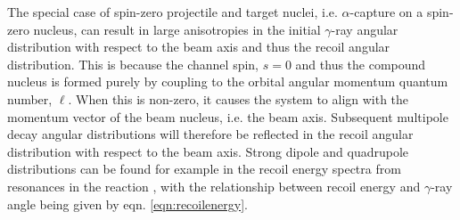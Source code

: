 The special case of spin-zero projectile and target nuclei, i.e. $\alpha$-capture on a spin-zero nucleus, can result in large anisotropies in the initial $\gamma$-ray angular distribution with respect to the beam axis and thus the recoil angular distribution. This is because the channel spin, $s=0$ and thus the compound nucleus is formed purely by coupling to the orbital angular momentum quantum number, $\ell$. When this is non-zero, it causes the system to align with the momentum vector of the beam nucleus, i.e. the beam axis. Subsequent multipole decay angular distributions will therefore be reflected in the recoil angular distribution with respect to the beam axis. Strong dipole and quadrupole distributions can be found for example in the recoil energy spectra from resonances in the \reac{\alpha}{\gamma} reaction \cite{mat06}, with the relationship between recoil energy and $\gamma$-ray angle being given by eqn. \ref{eqn:recoilenergy}. 


